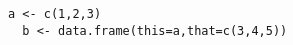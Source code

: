 \lipsum[1-2]\citep[vgl.][S. 95]{Sennet:2013aa}

\lstset{language=R}
\begin{lstlisting}[caption=R Code]
  a <- c(1,2,3)
  b <- data.frame(this=a,that=c(3,4,5))
\end{lstlisting}

\lipsum[1-2]\citep[vgl.][]{Vitello:2011aa}
